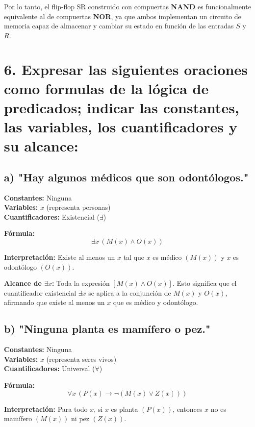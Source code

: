\documentclass[11pt,letterpaper]{article}
\begin{document}
Por lo tanto, el flip-flop SR construido con compuertas \textbf{NAND} es funcionalmente equivalente al de compuertas \textbf{NOR}, ya que ambos implementan un circuito de memoria capaz de almacenar y cambiar su estado en función de las entradas $S$ y $R$.



\section*{6. Expresar las siguientes oraciones como formulas de la lógica de predicados; indicar las constantes, las variables, los cuantificadores y su alcance:}

\subsection*{a) "Hay algunos médicos que son odontólogos."}

\textbf{Constantes:} Ninguna \\
\textbf{Variables:} \( x \) (representa personas) \\
\textbf{Cuantificadores:} Existencial (\( \exists \))

\textbf{Fórmula:}
\[
\exists x \, (M(x) \land O(x))
\]

\textbf{Interpretación:} Existe al menos un \( x \) tal que \( x \) es médico \( (M(x)) \) y \( x \) es odontólogo \( (O(x)) \).

\textbf{ Alcance de \( \exists x \):}
Toda la expresión \( [M(x) \land O(x)] \). Esto significa que el cuantificador existencial \( \exists x \) se aplica a la conjunción de \( M(x) \) y \( O(x) \), afirmando que existe al menos un \( x \) que es médico y odontólogo.

\subsection*{b) "Ninguna planta es mamífero o pez."}

\textbf{Constantes:} Ninguna \\
\textbf{Variables:} \( x \) (representa seres vivos) \\
\textbf{Cuantificadores:} Universal (\( \forall \))

\textbf{Fórmula:}
\[
\forall x \, (P(x) \rightarrow \neg (M(x) \lor Z(x)))
\]

\textbf{Interpretación:} Para todo \( x \), si \( x \) es planta \( (P(x)) \), entonces \( x \) no es mamífero \( (M(x)) \) ni pez \( (Z(x)) \).
\end{document}
